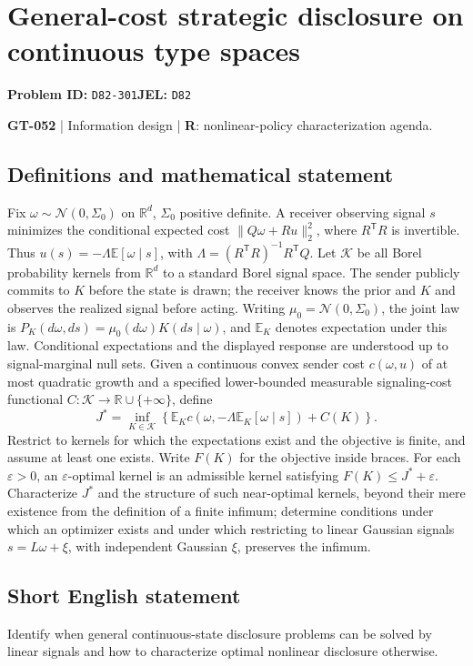 \documentclass[11pt,a4paper]{article}
\begin{document}
\section*{General-cost strategic disclosure on continuous type spaces}
\textbf{Problem ID:} \texttt{D82-301}\quad \textbf{JEL:} \texttt{D82}\par
\label{problem:OP-0182}
\label{game:GT-052}
{\sffamily\small\color{muted}
\textbf{GT-052} | Information design | \textbf{R}: nonlinear-policy characterization agenda.
\par}
\subsection*{Definitions and mathematical statement}
Fix $\omega\sim\mathcal N(0,\Sigma_0)$ on $\mathbb R^d$, $\Sigma_0$ positive definite. A receiver observing signal $s$ minimizes the conditional expected cost $\|Q\omega+Ru\|_2^2$, where $R^{\mathsf T}R$ is invertible. Thus $u(s)=-\Lambda\mathbb E[\omega\mid s]$, with $\Lambda=(R^{\mathsf T}R)^{-1}R^{\mathsf T}Q$. Let $\mathcal K$ be all Borel probability kernels from $\mathbb R^d$ to a standard Borel signal space. The sender publicly commits to $K$ before the state is drawn; the receiver knows the prior and $K$ and observes the realized signal before acting. Writing $\mu_0=\mathcal N(0,\Sigma_0)$, the joint law is $P_K(d\omega,ds)=\mu_0(d\omega)K(ds\mid\omega)$, and $\mathbb E_K$ denotes expectation under this law. Conditional expectations and the displayed response are understood up to signal-marginal null sets. Given a continuous convex sender cost $c(\omega,u)$ of at most quadratic growth and a specified lower-bounded measurable signaling-cost functional $C:\mathcal K\to\mathbb R\cup\{+\infty\}$, define
\[
 J^*=\inf_{K\in\mathcal K}\left\{
 \mathbb E_K c(\omega,-\Lambda\mathbb E_K[\omega\mid s])+C(K)\right\}.
\]
Restrict to kernels for which the expectations exist and the objective is finite, and assume at least one exists. Write $F(K)$ for the objective inside braces. For each $\varepsilon>0$, an $\varepsilon$-optimal kernel is an admissible kernel satisfying $F(K)\leq J^*+\varepsilon$. Characterize $J^*$ and the structure of such near-optimal kernels, beyond their mere existence from the definition of a finite infimum; determine conditions under which an optimizer exists and under which restricting to linear Gaussian signals $s=L\omega+\xi$, with independent Gaussian $\xi$, preserves the infimum.
\subsection*{Short English statement}
Identify when general continuous-state disclosure problems can be solved by linear signals and how to characterize optimal nonlinear disclosure otherwise.
\end{document}
